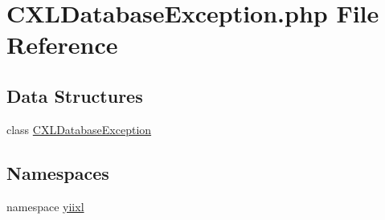 \hypertarget{CXLDatabaseException_8php}{
\section{CXLDatabaseException.php File Reference}
\label{CXLDatabaseException_8php}
}
\subsection*{Data Structures}
\begin{DoxyCompactItemize}
\item 
class \hyperlink{classCXLDatabaseException}{CXLDatabaseException}
\end{DoxyCompactItemize}
\subsection*{Namespaces}
\begin{DoxyCompactItemize}
\item 
namespace \hyperlink{namespaceyiixl}{yiixl}
\end{DoxyCompactItemize}
